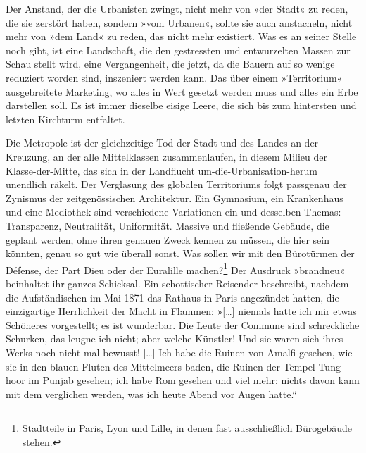 Der Anstand, der die Urbanisten zwingt, nicht mehr von »der Stadt«
zu reden, die sie zerstört haben, sondern »vom Urbanen«, sollte sie
auch anstacheln, nicht mehr von »dem Land« zu reden, das nicht mehr
existiert. Was es an seiner Stelle noch gibt, ist eine Landschaft,
die den gestressten und entwurzelten Massen zur Schau stellt wird,
eine Vergangenheit, die jetzt, da die Bauern auf so wenige
reduziert worden sind, inszeniert werden kann. Das über einem
»Territorium« ausgebreitete Marketing, wo alles in Wert gesetzt
werden muss und alles ein Erbe darstellen soll. Es ist immer
dieselbe eisige Leere, die sich bis zum hintersten und letzten
Kirchturm entfaltet.

Die Metropole ist der gleichzeitige Tod der Stadt und des Landes an
der Kreuzung, an der alle Mittelklassen zusammenlaufen, in diesem
Milieu der Klasse-der-Mitte, das sich in der Landflucht
um-die-Urbanisation-herum unendlich räkelt. Der Verglasung des
globalen Territoriums folgt passgenau der Zynismus der
zeitgenössischen Architektur. Ein Gymnasium, ein Krankenhaus und
eine Mediothek sind verschiedene Variationen ein und desselben
Themas: Transparenz, Neutralität, Uniformität. Massive und
fließende Gebäude, die geplant werden, ohne ihren genauen Zweck
kennen zu müssen, die hier sein könnten, genau so gut wie überall
sonst. Was sollen wir mit den Bürotürmen der Défense, der Part Dieu
oder der Euralille machen?\footnote{
Stadtteile in Paris, Lyon und Lille, in denen fast
ausschließlich Bürogebäude stehen.
}
Der Ausdruck »brandneu« beinhaltet ihr
ganzes Schicksal. Ein schottischer Reisender beschreibt, nachdem
die Aufständischen im Mai 1871 das Rathaus in Paris angezündet
hatten, die einzigartige Herrlichkeit der Macht in Flammen: »[…]
niemals hatte ich mir etwas Schöneres vorgestellt; es ist
wunderbar. Die Leute der Commune sind schreckliche Schurken, das
leugne ich nicht; aber welche Künstler! Und sie waren sich ihres
Werks noch nicht mal bewusst! […] Ich habe die Ruinen von Amalfi
gesehen, wie sie in den blauen Fluten des Mittelmeers baden, die
Ruinen der Tempel Tung-hoor im Punjab gesehen; ich habe Rom gesehen
und viel mehr: nichts davon kann mit dem verglichen werden, was ich
heute Abend vor Augen hatte.“

\extrapar{}

